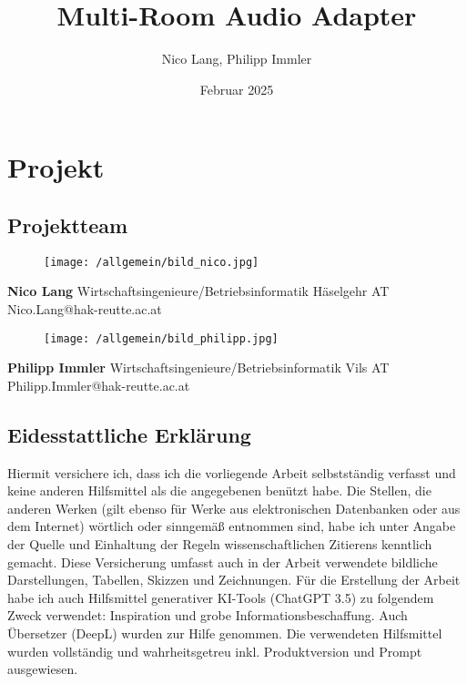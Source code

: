 \documentclass[11pt, twoside]{article}
\title{\textbf{Multi-Room Audio Adapter}}
\author{Nico Lang, Philipp Immler}
\date{Februar 2025}
\begin{document}
{}
\newpage
{}



\section*{Projekt}
\subsection*{Projektteam}
\begin{figure}[H]
	\texttt{[image: /allgemein/bild\_nico.jpg]}
\end{figure}
\textbf{Nico Lang}\newline
Wirtschaftsingenieure/Betriebsinformatik Häselgehr AT\newline
Nico.Lang@hak-reutte.ac.at\newline
\begin{figure}[H]
	\texttt{[image: /allgemein/bild\_philipp.jpg]}
\end{figure}
\noindent \textbf{Philipp Immler}\newline
Wirtschaftsingenieure/Betriebsinformatik Vils AT\newline
Philipp.Immler@hak-reutte.ac.at

\newpage

\subsection*{Eidesstattliche Erklärung}
Hiermit versichere ich, dass ich die vorliegende Arbeit selbstständig verfasst und keine anderen Hilfsmittel als die angegebenen benützt habe. Die Stellen, die anderen Werken (gilt ebenso für Werke aus elektronischen Datenbanken oder aus dem Internet) wörtlich oder sinngemäß entnommen sind, habe ich unter Angabe der Quelle und Einhaltung der Regeln wissenschaftlichen Zitierens kenntlich gemacht. Diese Versicherung umfasst auch in der Arbeit verwendete bildliche Darstellungen, Tabellen, Skizzen und Zeichnungen. Für die Erstellung der Arbeit habe ich auch Hilfsmittel generativer KI-Tools (ChatGPT 3.5) zu folgendem Zweck verwendet: Inspiration und grobe Informationsbeschaffung. Auch Übersetzer (DeepL) wurden zur Hilfe genommen. Die verwendeten Hilfsmittel wurden vollständig und wahrheitsgetreu inkl. Produktversion und Prompt ausgewiesen.\\
\end{document}
